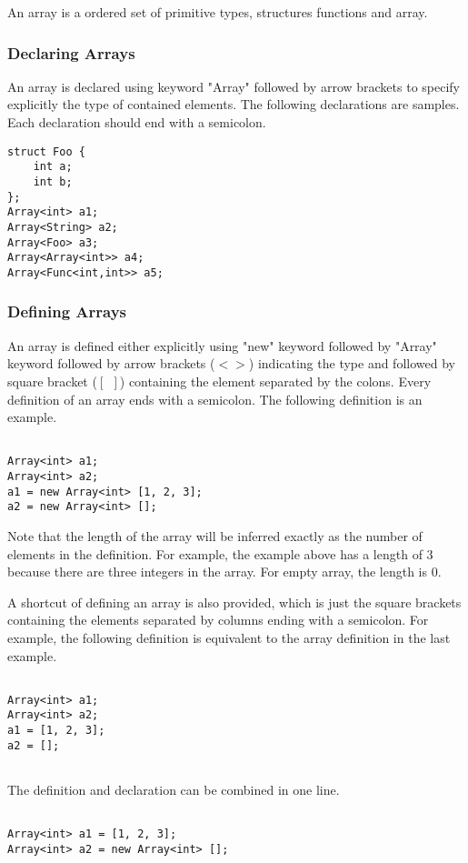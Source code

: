 An array is a ordered set of primitive types, structures functions and array.
\subsubsection{Declaring Arrays}
An array is declared using keyword "Array" followed by arrow brackets to specify explicitly the type of contained elements. The following declarations are samples. Each declaration should end with a semicolon.
\begin{lstlisting}[caption={array\_declaration.csm}, captionpos=b]
struct Foo {
    int a;
    int b;
};
Array<int> a1;
Array<String> a2;
Array<Foo> a3;
Array<Array<int>> a4;
Array<Func<int,int>> a5;
\end{lstlisting}

\subsubsection{Defining Arrays}
An array is defined either explicitly using "new" keyword followed by "Array" keyword followed by arrow brackets ($<>$) indicating the type and followed by square bracket ($[\ \ ]$) containing the element separated by the colons. Every definition of an array ends with a semicolon. The following definition is an example.
\begin{lstlisting}[caption={array\_definition.csm}, captionpos=b]

Array<int> a1;
Array<int> a2;
a1 = new Array<int> [1, 2, 3];
a2 = new Array<int> [];

\end{lstlisting}
Note that the length of the array will be inferred exactly as the number of elements in the definition. For example, the example above has a length of 3 because there are three integers in the array. For empty array, the length is 0.
\par A shortcut of defining an array is also provided, which is just the square brackets containing the elements separated by columns ending with a semicolon. For example, the following definition is equivalent to the array definition in the last example.
\begin{lstlisting}[caption={array\_definition\_short.csm}, captionpos=b]

Array<int> a1;
Array<int> a2;
a1 = [1, 2, 3];
a2 = [];


\end{lstlisting}

The definition and declaration can be combined in one line.
\begin{lstlisting}[caption={array\_definition\_oneline.csm}, captionpos=b]

Array<int> a1 = [1, 2, 3];
Array<int> a2 = new Array<int> [];

\end{lstlisting}

